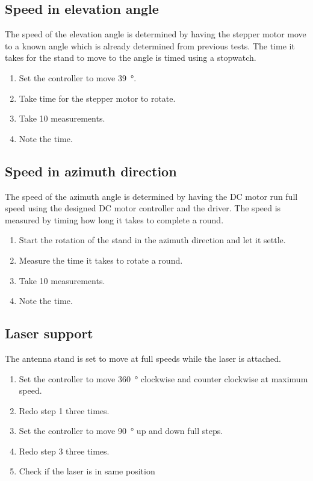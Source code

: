 \subsection*{Speed in elevation angle}
The speed of the elevation angle is determined by having the stepper motor move to a known angle which is already determined from previous tests. The time it takes for the stand to move to the angle is timed using a stopwatch.
\begin{enumerate}
\item Set the controller to move \SI{39}{\degree}.
\item Take time for the stepper motor to rotate.
\item Take 10 measurements.
\item Note the time.
\end{enumerate}

\subsection*{Speed in azimuth direction}
The speed of the azimuth angle is determined by having the DC motor run full speed using the designed DC motor controller and the driver. The speed is measured by timing how long it takes to complete a round.
\begin{enumerate}
\item Start the rotation of the stand in the azimuth direction and let it settle.
\item Measure the time it takes to rotate a round.
\item Take 10 measurements.
\item Note the time.
\end{enumerate}

\subsection*{Laser support}
The antenna stand is set to move at full speeds while the laser is attached.
\begin{enumerate}
\item Set the controller to move \SI{360}{\degree} clockwise and counter clockwise at maximum speed.
\item Redo step 1 three times.
\item Set the controller to move \SI{90}{\degree} up and down full steps.
\item Redo step 3 three times.
\item Check if the laser is in same position
\end{enumerate}

